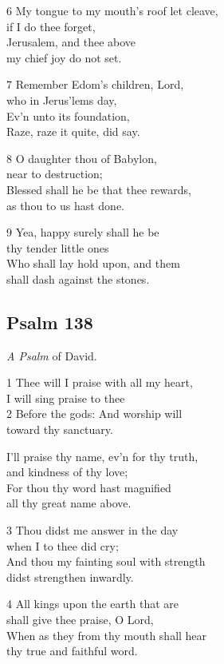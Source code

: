 6 My tongue to my mouth’s roof let cleave,\\
if I do thee forget,\\
Jerusalem, and thee above\\
my chief joy do not set.

7 Remember Edom’s children, Lord,\\
who in Jerus’lems day,\\
Ev’n unto its foundation,\\
Raze, raze it quite, did say.

8 O daughter thou of Babylon,\\
near to destruction;\\
Blessed shall he be that thee rewards,\\
as thou to us hast done.

9 Yea, happy surely shall he be\\
thy tender little ones\\
Who shall lay hold upon, and them\\
shall dash against the stones.

\begin{center}
\quad{}\quad{}
\end{center}

\subsection*{Psalm 138}

\emph{A Psalm} of David.

1 Thee will I praise with all my heart,\\
I will sing praise to thee\\
2 Before the gods: And worship will\\
toward thy sanctuary.

I’ll praise thy name, ev’n for thy truth,\\
and kindness of thy love;\\
For thou thy word hast magnified\\
all thy great name above.

3 Thou didst me answer in the day\\
when I to thee did cry;\\
And thou my fainting soul with strength\\
didst strengthen inwardly.

4 All kings upon the earth that are\\
shall give thee praise, O Lord,\\
When as they from thy mouth shall hear\\
thy true and faithful word.

